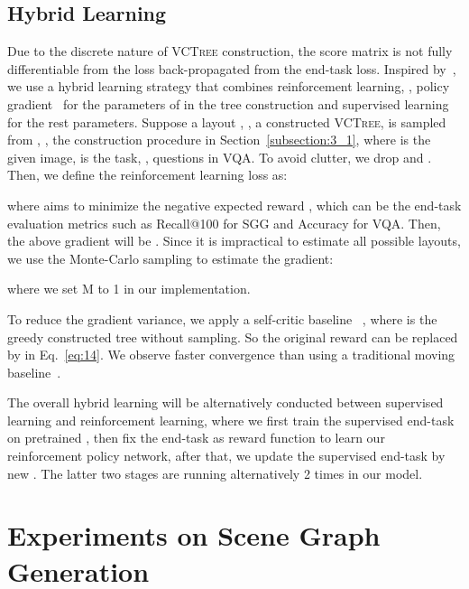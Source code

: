 \documentclass[10pt,twocolumn,letterpaper]{article}
\begin{document}
\subsection{Hybrid Learning}
\label{subsection:3_5}
Due to the discrete nature of \textsc{VCTree} construction, the score matrix  is not fully differentiable from the loss back-propagated from the end-task loss. Inspired by~\cite{hu2017learning}, we use a hybrid learning strategy that combines reinforcement learning, \ie, policy gradient~\cite{williams1992simple} for the parameters  of  in the tree construction and supervised learning for the rest parameters. Suppose a layout , \ie, a constructed \textsc{VCTree}, is sampled from , \ie, the construction procedure in Section~\ref{subsection:3_1}, where  is the given image,  is the task, \eg, questions in VQA. To avoid clutter, we drop  and . Then, we define the reinforcement learning loss  as:

where  aims to minimize the negative expected reward , which can be the end-task evaluation metrics such as Recall@100 for SGG and Accuracy for VQA. Then, the above gradient will be . Since it is impractical to estimate all possible layouts, we use the Monte-Carlo sampling to estimate the gradient: 

where we set M to 1 in our implementation.


To reduce the gradient variance, we apply a self-critic baseline~\cite{Rennie_2017_CVPR} , where  is the greedy constructed tree without sampling. So the original reward  can be replaced by  in Eq.~\eqref{eq:14}. We observe faster convergence than using a traditional moving baseline~\cite{mnih2014recurrent}. 

The overall hybrid learning will be alternatively conducted between supervised learning and reinforcement learning, where we first train the supervised end-task on pretrained , then fix the end-task as reward function to learn our reinforcement policy network, after that, we update the supervised end-task by new . The latter two stages are running alternatively 2 times in our model.












\section{Experiments on Scene Graph Generation}
\end{document}
